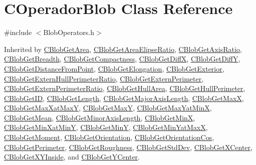 \hypertarget{class_c_operador_blob}{
\section{COperadorBlob Class Reference}
\label{class_c_operador_blob}
}


{\ttfamily \#include $<$BlobOperators.h$>$}



Inherited by \hyperlink{class_c_blob_get_area}{CBlobGetArea}, \hyperlink{class_c_blob_get_area_elipse_ratio}{CBlobGetAreaElipseRatio}, \hyperlink{class_c_blob_get_axis_ratio}{CBlobGetAxisRatio}, \hyperlink{class_c_blob_get_breadth}{CBlobGetBreadth}, \hyperlink{class_c_blob_get_compactness}{CBlobGetCompactness}, \hyperlink{class_c_blob_get_diff_x}{CBlobGetDiffX}, \hyperlink{class_c_blob_get_diff_y}{CBlobGetDiffY}, \hyperlink{class_c_blob_get_distance_from_point}{CBlobGetDistanceFromPoint}, \hyperlink{class_c_blob_get_elongation}{CBlobGetElongation}, \hyperlink{class_c_blob_get_exterior}{CBlobGetExterior}, \hyperlink{class_c_blob_get_extern_hull_perimeter_ratio}{CBlobGetExternHullPerimeterRatio}, \hyperlink{class_c_blob_get_extern_perimeter}{CBlobGetExternPerimeter}, \hyperlink{class_c_blob_get_extern_perimeter_ratio}{CBlobGetExternPerimeterRatio}, \hyperlink{class_c_blob_get_hull_area}{CBlobGetHullArea}, \hyperlink{class_c_blob_get_hull_perimeter}{CBlobGetHullPerimeter}, \hyperlink{class_c_blob_get_i_d}{CBlobGetID}, \hyperlink{class_c_blob_get_length}{CBlobGetLength}, \hyperlink{class_c_blob_get_major_axis_length}{CBlobGetMajorAxisLength}, \hyperlink{class_c_blob_get_max_x}{CBlobGetMaxX}, \hyperlink{class_c_blob_get_max_xat_max_y}{CBlobGetMaxXatMaxY}, \hyperlink{class_c_blob_get_max_y}{CBlobGetMaxY}, \hyperlink{class_c_blob_get_max_yat_min_x}{CBlobGetMaxYatMinX}, \hyperlink{class_c_blob_get_mean}{CBlobGetMean}, \hyperlink{class_c_blob_get_minor_axis_length}{CBlobGetMinorAxisLength}, \hyperlink{class_c_blob_get_min_x}{CBlobGetMinX}, \hyperlink{class_c_blob_get_min_xat_min_y}{CBlobGetMinXatMinY}, \hyperlink{class_c_blob_get_min_y}{CBlobGetMinY}, \hyperlink{class_c_blob_get_min_yat_max_x}{CBlobGetMinYatMaxX}, \hyperlink{class_c_blob_get_moment}{CBlobGetMoment}, \hyperlink{class_c_blob_get_orientation}{CBlobGetOrientation}, \hyperlink{class_c_blob_get_orientation_cos}{CBlobGetOrientationCos}, \hyperlink{class_c_blob_get_perimeter}{CBlobGetPerimeter}, \hyperlink{class_c_blob_get_roughness}{CBlobGetRoughness}, \hyperlink{class_c_blob_get_std_dev}{CBlobGetStdDev}, \hyperlink{class_c_blob_get_x_center}{CBlobGetXCenter}, \hyperlink{class_c_blob_get_x_y_inside}{CBlobGetXYInside}, and \hyperlink{class_c_blob_get_y_center}{CBlobGetYCenter}.

